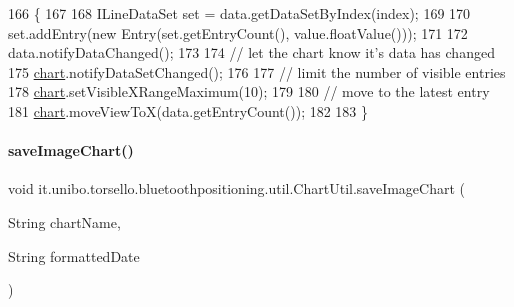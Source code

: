 \begin{DoxyCode}
166                                                                    \{
167 
168         ILineDataSet \textcolor{keyword}{set} = data.getDataSetByIndex(index);
169 
170         \textcolor{keyword}{set}.addEntry(\textcolor{keyword}{new} Entry(\textcolor{keyword}{set}.getEntryCount(), value.floatValue()));
171 
172         data.notifyDataChanged();
173 
174         \textcolor{comment}{// let the chart know it's data has changed}
175         \hyperlink{classit_1_1unibo_1_1torsello_1_1bluetoothpositioning_1_1util_1_1ChartUtil_a6c34176fdfb85bac1d3aa1529b49ad5f_a6c34176fdfb85bac1d3aa1529b49ad5f}{chart}.notifyDataSetChanged();
176 
177         \textcolor{comment}{// limit the number of visible entries}
178         \hyperlink{classit_1_1unibo_1_1torsello_1_1bluetoothpositioning_1_1util_1_1ChartUtil_a6c34176fdfb85bac1d3aa1529b49ad5f_a6c34176fdfb85bac1d3aa1529b49ad5f}{chart}.setVisibleXRangeMaximum(10);
179 
180         \textcolor{comment}{// move to the latest entry}
181         \hyperlink{classit_1_1unibo_1_1torsello_1_1bluetoothpositioning_1_1util_1_1ChartUtil_a6c34176fdfb85bac1d3aa1529b49ad5f_a6c34176fdfb85bac1d3aa1529b49ad5f}{chart}.moveViewToX(data.getEntryCount());
182 
183     \}
\end{DoxyCode}
\hypertarget{classit_1_1unibo_1_1torsello_1_1bluetoothpositioning_1_1util_1_1ChartUtil_afdbdcf15b073da5b03613dbccc7681a9_afdbdcf15b073da5b03613dbccc7681a9}{}\label{classit_1_1unibo_1_1torsello_1_1bluetoothpositioning_1_1util_1_1ChartUtil_afdbdcf15b073da5b03613dbccc7681a9_afdbdcf15b073da5b03613dbccc7681a9} 
\paragraph{\texorpdfstring{save\+Image\+Chart()}{saveImageChart()}}
{\footnotesize\ttfamily void it.\+unibo.\+torsello.\+bluetoothpositioning.\+util.\+Chart\+Util.\+save\+Image\+Chart (\begin{DoxyParamCaption}\item[{String}]{chart\+Name,  }\item[{String}]{formatted\+Date }\end{DoxyParamCaption})}


